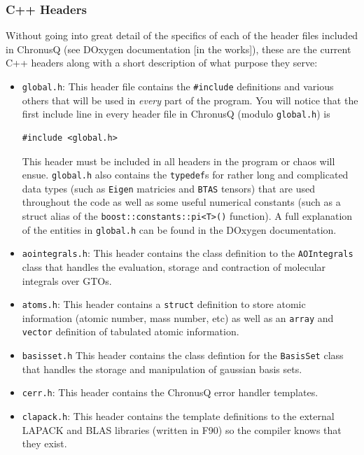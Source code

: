 \documentclass[12pt]{article}
\begin{document}
\subsubsection{C++ Headers}
Without going into great detail of the specifics of each of the header files included in ChronusQ (see DOxygen documentation [in the works]), these are the current C++ headers along with a short description of what purpose they serve:
\begin{itemize}
\item \texttt{global.h}: This header file contains the \texttt{\#include} definitions and various others that will be used in \emph{every} part of the program. You will notice that the first include line in every header file in ChronusQ (modulo \texttt{global.h}) is
\begin{lstlisting}
#include <global.h>
\end{lstlisting}
This header must be included in all headers in the program or chaos will ensue. \texttt{global.h} also contains the \texttt{typedef}s for rather long and complicated data types (such as \texttt{Eigen} matricies and \texttt{BTAS} tensors) that are used throughout the code as well as some useful numerical constants (such as a struct alias of the \texttt{boost::constants::pi<T>()} function). A full explanation of the entities in \texttt{global.h} can be found in the DOxygen documentation.

\item \texttt{aointegrals.h}: This header contains the class definition to the \texttt{AOIntegrals} class that handles the evaluation, storage and contraction of molecular integrals over GTOs.

\item \texttt{atoms.h}: This header contains a \texttt{struct} definition to store atomic information (atomic number, mass number, etc) as well as an \texttt{array} and \texttt{vector} definition of tabulated atomic information.

\item \texttt{basisset.h} This header contains the class defintion for the \texttt{BasisSet} class that handles the storage and manipulation of gaussian basis sets.

\item \texttt{cerr.h}: This header contains the ChronusQ error handler templates.

\item \texttt{clapack.h}: This header contains the template definitions to the external LAPACK and BLAS libraries (written in F90) so the compiler knows that they exist.


\end{itemize}
\end{document}
